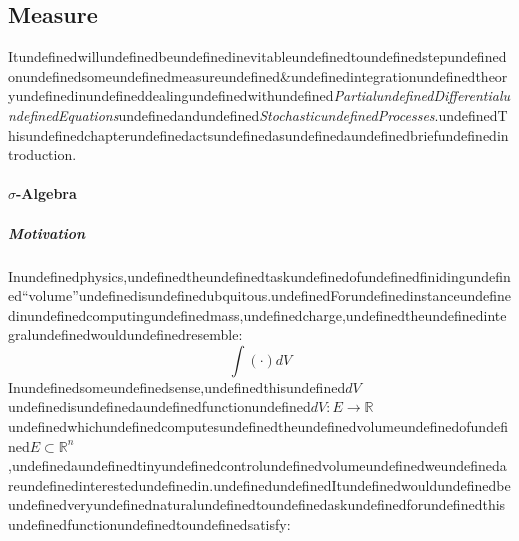 \subsection{Measure}

Itundefinedwillundefinedbeundefinedinevitableundefinedtoundefinedstepundefinedonundefinedsomeundefinedmeasureundefined\&undefinedintegrationundefinedtheoryundefinedinundefineddealingundefinedwithundefined\textit{PartialundefinedDifferentialundefinedEquations}undefinedandundefined\textit{StochasticundefinedProcesses}.undefinedThisundefinedchapterundefinedactsundefinedasundefinedaundefinedbriefundefinedintroduction.

\paragraph{$\sigma$-Algebra}

\subparagraph{Motivation}

Inundefinedphysics,undefinedtheundefinedtaskundefinedofundefinedfinidingundefined``volume''undefinedisundefinedubquitous.undefinedForundefinedinstanceundefinedinundefinedcomputingundefinedmass,undefinedcharge,undefinedtheundefinedintegralundefinedwouldundefinedresemble:
\begin{equation}
\int (\cdot ) dV
\end{equation}
Inundefinedsomeundefinedsense,undefinedthisundefined$dV$undefinedisundefinedaundefinedfunctionundefined$dV:E\to \mathbb{R}$undefinedwhichundefinedcomputesundefinedtheundefinedvolumeundefinedofundefined$E\subset \mathbb{R}^n$,undefinedaundefinedtinyundefinedcontrolundefinedvolumeundefinedweundefinedareundefinedinterestedundefinedin.undefinedundefinedItundefinedwouldundefinedbeundefinedveryundefinednaturalundefinedtoundefinedaskundefinedforundefinedthisundefinedfunctionundefinedtoundefinedsatisfy:

